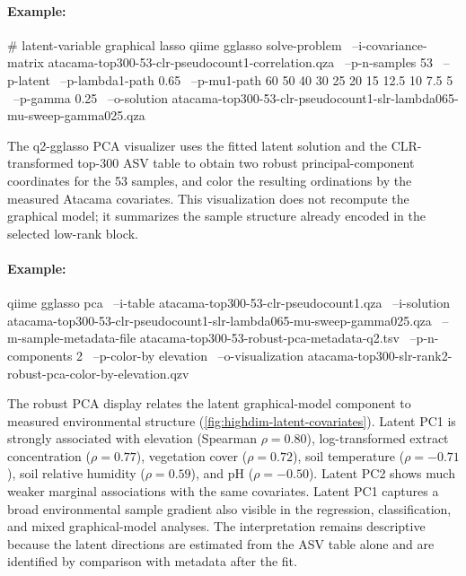 \documentclass[11pt,a4paper]{article}
\begin{document}
\paragraph{Example:} \mbox{}
\begin{PseudoCode}
# latent-variable graphical lasso
qiime gglasso solve-problem \
    --i-covariance-matrix atacama-top300-53-clr-pseudocount1-correlation.qza \
    --p-n-samples 53 \
    --p-latent \
    --p-lambda1-path 0.65 \
    --p-mu1-path 60 50 40 30 25 20 15 12.5 10 7.5 5 \
    --p-gamma 0.25 \
    --o-solution atacama-top300-53-clr-pseudocount1-slr-lambda065-mu-sweep-gamma025.qza
\end{PseudoCode}

The q2-gglasso PCA visualizer uses the fitted latent solution and the
CLR-transformed top-300 ASV table to
obtain two robust principal-component coordinates for the 53 samples, and color
the resulting ordinations by the measured Atacama covariates. This visualization
does not recompute the graphical model; it summarizes the sample structure
already encoded in the selected low-rank block.

\paragraph{Example:} \mbox{}
\begin{PseudoCode}
qiime gglasso pca \
    --i-table atacama-top300-53-clr-pseudocount1.qza \
    --i-solution atacama-top300-53-clr-pseudocount1-slr-lambda065-mu-sweep-gamma025.qza \
    --m-sample-metadata-file atacama-top300-53-robust-pca-metadata-q2.tsv \
    --p-n-components 2 \
    --p-color-by elevation \
    --o-visualization atacama-top300-slr-rank2-robust-pca-color-by-elevation.qzv
\end{PseudoCode}

The robust PCA display relates the latent graphical-model component to measured environmental structure
(\autoref{fig:highdim-latent-covariates}). Latent PC1 is strongly associated
with elevation (Spearman $\rho=0.80$), log-transformed extract concentration
($\rho=0.77$), vegetation cover ($\rho=0.72$), soil temperature
($\rho=-0.71$), soil relative humidity ($\rho=0.59$), and pH
($\rho=-0.50$). Latent PC2 shows much weaker marginal associations with the same
covariates. Latent PC1 captures a broad environmental sample gradient also
visible in the regression, classification, and mixed graphical-model analyses.
The interpretation remains descriptive because the latent
directions are estimated from the ASV table alone and are identified by
comparison with metadata after the fit.
\end{document}
